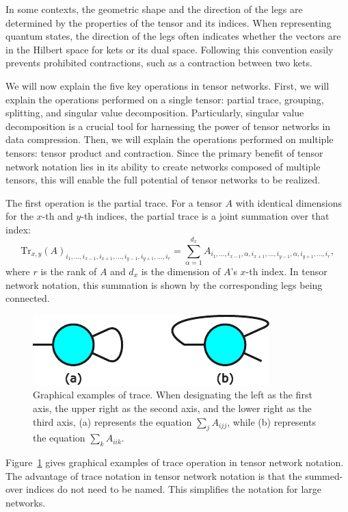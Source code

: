 \documentclass[12pt,dvipdfmx,twoside,openright]{report}
\begin{document}
In some contexts, the geometric shape and the direction of the legs are determined by the properties of the tensor and its indices.
When representing quantum states, the direction of the legs often indicates whether the vectors are in the Hilbert space for kets or its dual space.
Following this convention easily prevents prohibited contractions, such as a contraction between two kets.


We will now explain the five key operations in tensor networks.
First, we will explain the operations performed on a single tensor: partial trace, grouping, splitting, and singular value decomposition.
Particularly, singular value decomposition is a crucial tool for harnessing the power of tensor networks in data compression.
Then, we will explain the operations performed on multiple tensors: tensor product and contraction.
Since the primary benefit of tensor network notation lies in its ability to create networks composed of multiple tensors, this will enable the full potential of tensor networks to be realized.

The first operation is the partial trace.
For a tensor $A$ with identical dimensions for the $x$-th and $y$-th indices, the partial trace is a joint summation over that index:
\begin{equation}
    \mathrm{Tr}_{x,y}(A)_{i_1,\dots,i_{x-1},i_{x+1},\dots,i_{y-1},i_{y+1},\dots,i_r}=\sum_{\alpha=1}^{d_x} A_{i_1,\dots,i_{x-1},\alpha,i_{x+1},\dots,i_{y-1},\alpha,i_{y+1},\dots,i_r},
\end{equation}
where $r$ is the rank of $A$ and $d_x$ is the dimension of $A$'s $x$-th index.
In tensor network notation, this summation is shown by the corresponding legs being connected.

\begin{figure}
    \centering
    \includegraphics[width=0.4\linewidth]{fig-trace.pdf}
    \caption{Graphical examples of trace.
    When designating the left as the first axis, the upper right as the second axis, and the lower right as the third axis, (a) represents the equation $\sum_j A_{ijj}$, while (b) represents the equation $\sum_k A_{iik}$.}
    \label{fig:trace}
\end{figure}

Figure~\ref{fig:trace} gives graphical examples of trace operation in tensor network notation.
The advantage of trace notation in tensor network notation is that the summed-over indices do not need to be named.
This simplifies the notation for large networks.
\end{document}
